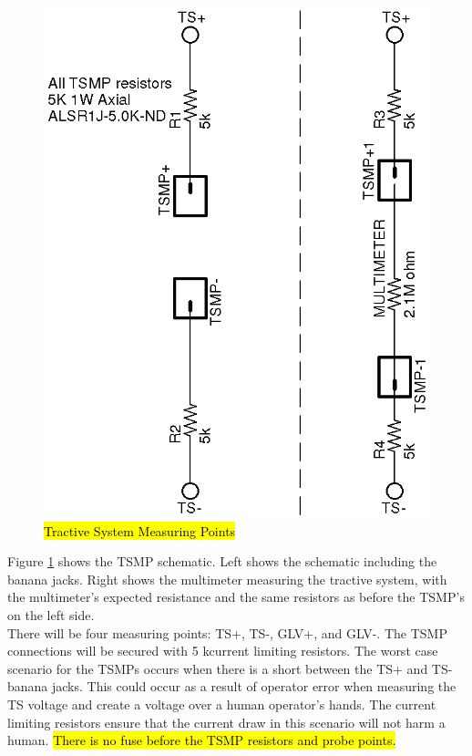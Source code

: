 \documentclass{article}
\DeclareRobustCommand{\hlr}[1]{{\sethlcolor{red}\hl{#1}}}
\begin{document}
            \begin{figure}[H]
                \centering
                \includegraphics{TSMP}
                \caption{\hlr{Tractive System Measuring Points}}
                \label{fig:TSMPschematic}
            \end{figure}

            Figure \ref{fig:TSMPschematic} shows the TSMP schematic. Left shows the schematic including the banana jacks. Right shows the multimeter measuring the tractive system, with the multimeter's expected resistance and the same resistors as before the TSMP's on the left side.\\

            There will be four measuring points: TS+, TS-, GLV+, and GLV-. The TSMP connections will be secured with 5 k\ohm current limiting resistors. The worst case scenario for the TSMPs occurs when there is a short between the TS+ and TS- banana jacks. This could occur as a result of operator error when measuring the TS  voltage and create a voltage over a human operator's hands. The current limiting resistors ensure that the current draw in this scenario will not harm a human. \hlr{There is no fuse before the TSMP resistors and probe points.}
\end{document}
